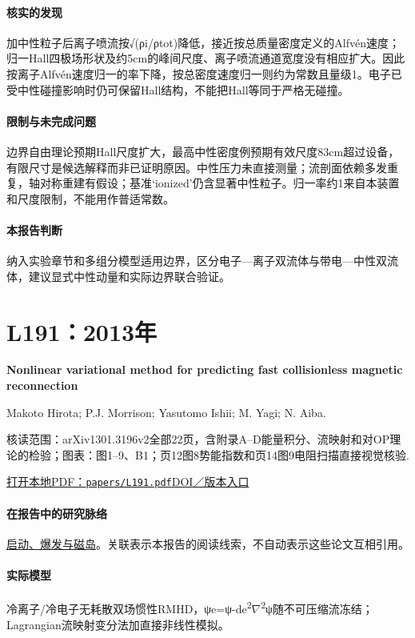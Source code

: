 \paragraph{核实的发现}加中性粒子后离子喷流按√(ρi/ρtot)降低，接近按总质量密度定义的Alfvén速度；归一Hall四极场形状及约5cm的峰间尺度、离子喷流通道宽度没有相应扩大。因此按离子Alfvén速度归一的率下降，按总密度速度归一则约为常数且量级1。电子已受中性碰撞影响时仍可保留Hall结构，不能把Hall等同于严格无碰撞。

\paragraph{限制与未完成问题}边界自由理论预期Hall尺度扩大，最高中性密度例预期有效尺度83cm超过设备，有限尺寸是候选解释而非已证明原因。中性压力未直接测量；流剖面依赖多发重复，轴对称重建有假设；基准‘ionized’仍含显著中性粒子。归一率约1来自本装置和尺度限制，不能用作普适常数。

\paragraph{本报告判断}纳入实验章节和多组分模型适用边界，区分电子—离子双流体与带电—中性双流体，建议显式中性动量和实际边界联合验证。

\section{L191：2013年}\label{paper:L191}

\textbf{Nonlinear variational method for predicting fast collisionless magnetic reconnection}\citep{L191}\

Makoto Hirota;  P.J. Morrison;  Yasutomo Ishii;  M. Yagi;  N. Aiba.

\textsf{核读范围：}arXiv1301.3196v2全部22页，含附录A–D能量积分、流映射和对OP理论的检验；\textsf{图表：}图1–9、B1；页12图8势能指数和页14图9电阻扫描直接视觉核验.

\href{run:papers/L191.pdf}{打开本地PDF：\texttt{papers/L191.pdf}}\quad\href{https://doi.org/10.1088/0029-5515/53/6/063024}{DOI／版本入口}

\paragraph{在报告中的研究脉络}\hyperref[story:onset]{启动、爆发与磁岛}。关联表示本报告的阅读线索，不自动表示这些论文互相引用。

\paragraph{实际模型}冷离子/冷电子无耗散双场惯性RMHD，ψe=ψ-de\textsuperscript{2}\ensuremath{\nabla}\textsuperscript{2}ψ随不可压缩流冻结；Lagrangian流映射变分法加直接非线性模拟。

